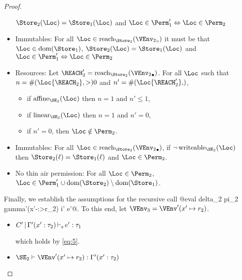 \begin{proof}
\begin{itemize}
    $\Store_2(\Loc) = \Store_1 (\Loc)$
    and $\Loc\in\Perm_1' \Leftrightarrow \Loc\in\Perm_2$ 
  \item Immutables: For all $\Loc \in
    \Reach{\Store_2}{\ImmutableBorrows{\VEnv_2}}$ it must be that
    $\Loc\in\Dom{\Store_1}$, 
    $\Store_2 (\Loc) = \Store_1 (\Loc)$
    and $\Loc\in{\Perm_1'} \Leftrightarrow \Loc\in\Perm_2$ 
  \item Resources:
    Let $\REACH_2' =\Reach{\Store_2}{\Active{\VEnv_2}}$.
    For all $\Loc$ such that $n= \MultiNumber\Loc{\REACH_2} >0$ and $n' =
    \MultiNumber\Loc{\REACH_2'}$, 
    \begin{itemize}
    \item if $\Affine{\SE_2}\Loc$ then $n=1$ and $n'\le 1$,
    \item if $\Linear{\SE_2}\Loc$ then $n=1$ and $n' = 0$,
    \item if $n'=0$, then $\Loc\notin\Perm_2$.
    \end{itemize}
  \item Immutables: For all $\Loc \in \Reach
    {\Store_2}{\Active{\VEnv_2}}$, if $\neg\Writeable{\SE_2}\Loc$ then
    $\Store_2 (\ell) = \Store_1 (\ell)$ and $\Loc\in \Perm_2$.
  \item No thin air permission: For all $\Loc\in \Perm_2$, $\Loc
    \in \Perm_1' \cup  \Dom{\Store_2} \setminus \Dom{\Store_1}$.
  \end{itemize}
  
  Finally, we establish the assumptions for the recursive call 
  @eval delta_2 pi_2 gamma'(x'-:>r_2) i' e'@.
  To this end, let $\VEnv_3 = \VEnv' (x'\mapsto r_2)$.
  \begin{itemize}
  \item $C' \operatorname{|} \Gamma'(x' : \tau_2) \operatorname{\vdash_s} e' : \tau_1$

    which holds by \eqref{eq:5}.
  \item $\SE_2 \vdash \VEnv' (x' \mapsto r_2) : \E'\bvar{x'}{\tau_2} $


\end{itemize}
\end{proof}
